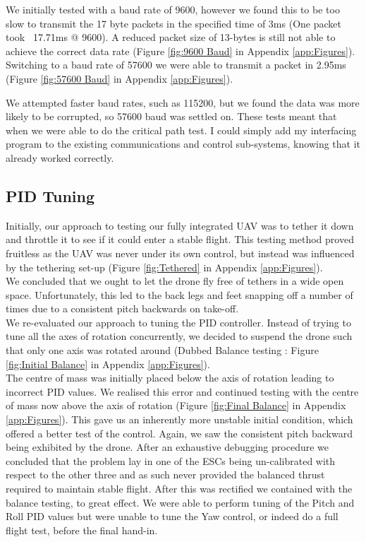 \documentclass[a4paper,11pt]{article}
\begin{document}
We initially tested with a baud rate of 9600, however we found this to be too slow to transmit the 17 byte packets in the specified time of 3ms (One packet took ~17.71ms @ 9600). A reduced packet size of 13-bytes is still not able to achieve the correct data rate (Figure \ref{fig:9600 Baud} in Appendix \ref{app:Figures}). 
Switching to a baud rate of 57600 we were able to transmit a packet in 2.95ms (Figure \ref{fig:57600 Baud} in Appendix \ref{app:Figures}).

We attempted faster baud rates, such as 115200, but we found the data was more likely to be corrupted, so 57600 baud was settled on.
These tests meant that when we were able to do the critical path test. I could simply add my interfacing program to the existing communications and control sub-systems, knowing that it already worked correctly.
\subsection{PID Tuning}
Initially, our approach to testing our fully integrated UAV was to tether it down and throttle it to see if it could enter a stable flight. This testing method proved fruitless as the UAV was never under its own control, but instead was influenced by the tethering set-up (Figure \ref{fig:Tethered} in Appendix \ref{app:Figures}).\\

 We concluded that we ought to let the drone fly free of tethers in a wide open space. Unfortunately, this led to the back legs and feet snapping off a number of times due to a consistent pitch backwards on take-off.\\ 
 We re-evaluated our approach to tuning the PID controller. Instead of trying to tune all the axes of rotation concurrently, we decided to suspend the drone such that only one axis was rotated around (Dubbed Balance testing : Figure \ref{fig:Initial Balance} in Appendix \ref{app:Figures}).\\

  The centre of mass was initially placed below the axis of rotation leading to incorrect PID values. We realised this error and continued testing with the centre of mass now above the axis of rotation (Figure \ref{fig:Final Balance} in Appendix \ref{app:Figures}). This gave us an inherently more unstable initial condition, which offered a better test of the control. Again, we saw the consistent pitch backward being exhibited by the drone. After an exhaustive debugging procedure we concluded that the problem lay in one of the ESCs being un-calibrated with respect to the other three and as such never provided the balanced thrust required to maintain stable flight. After this was rectified we contained with the balance testing, to great effect.
    We were able to perform tuning of the Pitch and Roll PID values but were unable to tune the Yaw control, or indeed do a full flight test, before the final hand-in.
\end{document}
